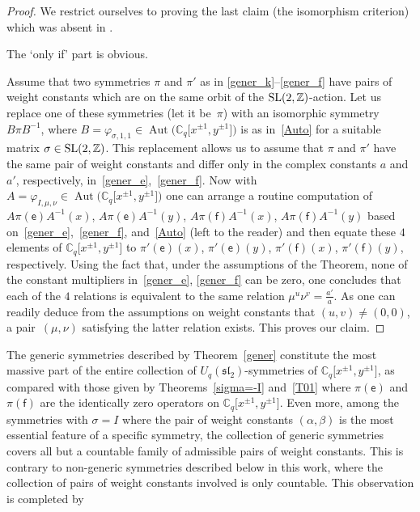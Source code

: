 \documentclass[pdftex]{sigma}
\numberwithin{equation}{section}
\begin{document}
\begin{proof} We restrict ourselves to proving the last claim (the isomorphism criterion) which was absent in \cite[Theorem 4.1]{S}.

The `only if' part is obvious.

Assume that two symmetries $\pi$ and $\pi'$ as in \eqref{gener_k}--\eqref{gener_f} have pairs of weight constants which are on the same orbit of the ${\rm SL}(2,\mathbb{Z})$-action. Let us replace one of these symmetries (let it be~$\pi$) with an isomorphic symmetry $B\pi B^{-1}$, where $B=\varphi_{\sigma,1,1}\in\operatorname{Aut}\big(\mathbb{C}_q\big[x^{\pm 1},y^{\pm 1}\big]\big)$ is as in~\eqref{Auto} for a suitable matrix $\sigma\in {\rm SL}(2,\mathbb{Z})$. This replacement allows us to assume that $\pi$ and $\pi'$ have the same pair of weight constants and differ only in the complex constants $a$ and $a'$, respectively, in~\eqref{gener_e},~\eqref{gener_f}. Now with $A=\varphi_{I,\mu,\nu}\in\operatorname{Aut}\big(\mathbb{C}_q\big[x^{\pm 1},y^{\pm 1}\big]\big)$ one can arrange a routine computation of $A\pi(\mathsf{e})A^{-1}(x)$, $A\pi(\mathsf{e})A^{-1}(y)$, $A\pi(\mathsf{f})A^{-1}(x)$, $A\pi(\mathsf{f})A^{-1}(y)$ based on~\eqref{gener_e},~\eqref{gener_f}, and~\eqref{Auto} (left to the reader) and then equate these $4$ elements of $\mathbb{C}_q\big[x^{\pm 1},y^{\pm 1}\big]$ to $\pi'(\mathsf{e})(x)$, $\pi'(\mathsf{e})(y)$, $\pi'(\mathsf{f})(x)$, $\pi'(\mathsf{f})(y)$, respectively. Using the fact that, under the assumptions of the Theorem, none of the constant multipliers in~\eqref{gener_e}, \eqref{gener_f} can be zero, one concludes that each of the $4$ relations is equivalent to the same relation $\mu^u\nu^v=\frac{a'}a$. As one can readily deduce from the assumptions on weight constants that $(u,v)\ne(0,0)$, a pair~$(\mu,\nu)$ satisfying the latter relation exists. This proves our claim.
\end{proof}

\begin{Remark}The generic symmetries described by Theorem~\ref{gener} constitute the most massive part of the entire collection of $U_q(\mathfrak{sl}_2)$-symmetries of $\mathbb{C}_q\big[x^{\pm 1},y^{\pm 1}\big]$, as compared with those given by Theorems~\ref{sigma=-I} and~\ref{T01} where $\pi(\mathsf{e})$ and $\pi(\mathsf{f})$ are the identically zero operators on $\mathbb{C}_q\big[x^{\pm 1},y^{\pm 1}\big]$. Even more, among the symmetries with $\sigma=I$ where the pair of weight constants $(\alpha,\beta)$ is the most essential feature of a specific symmetry, the collection of generic symmetries covers all but a countable family of admissible pairs of weight constants. This is contrary to non-generic symmetries described below in this work, where the collection of pairs of weight constants involved is only countable. This observation is completed by
\end{Remark}
\end{document}
